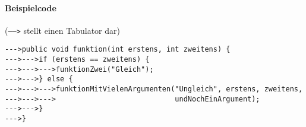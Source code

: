 \documentclass[a4paper,12pt,halfparskip,DIV14]{scrartcl}
\begin{document}
\paragraph{Beispielcode} (\texttt{----->} stellt einen Tabulator dar)

\begin{verbatim}
--->public void funktion(int erstens, int zweitens) {
--->--->if (erstens == zweitens) {
--->--->--->funktionZwei("Gleich");
--->--->} else {
--->--->--->funktionMitVielenArgumenten("Ungleich", erstens, zweitens,
--->--->--->                            undNochEinArgument);
--->--->}
--->}
\end{verbatim}
\end{document}

